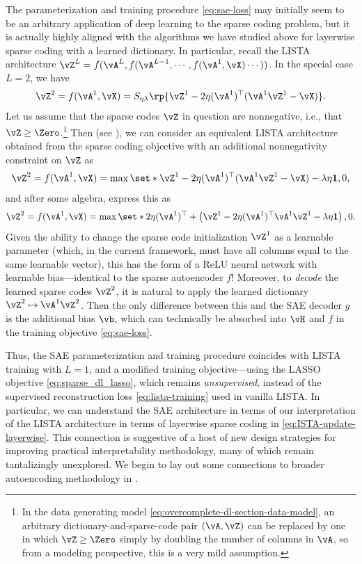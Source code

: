 \documentclass[../../book-main.tex]{subfiles}
\begin{document}
The parameterization and training procedure \eqref{eq:sae-loss} may initially
seem to be an arbitrary application of deep learning to the sparse coding
problem, but it is actually highly aligned with the algorithms we have studied
above for layerwise sparse coding with a learned dictionary.
In particular, recall the LISTA %
architecture $\vZ^{L} = f(\vA^L, f(\vA^{L-1}, \cdots, f(\vA^1, \vX) \cdots ))$.
In the special case $L=2$, we have
\begin{equation}
    \vZ^2 = f(\vA^1, \vX)
    =S_{\eta\lambda}\rp{\vZ^{1} - 2\eta(\vA^{1})^{\top}(\vA^1\vZ^{1} - \vX)}.
\end{equation}
Let us assume that the sparse codes $\vZ$ in question are nonnegative, i.e.,
that $\vZ \geq \Zero$.\footnote{In the data generating model
    \eqref{eq:overcomplete-dl-section-data-model}, an arbitrary
    dictionary-and-sparse-code pair $(\vA, \vZ)$ can be replaced by one in which
    $\vZ \geq \Zero$ simply by doubling the number of columns in $\vA$, so from
a modeling perspective, this is a very mild assumption.}
Then (see ), we can consider an equivalent
LISTA architecture obtained from the sparse coding objective with an additional
nonnegativity constraint on $\vZ$ as
\begin{equation}
    \vZ^2 = f(\vA^1, \vX)
    =\max \set*{\vZ^{1} - 2\eta(\vA^{1})^{\top}(\vA^1\vZ^{1} - \vX)
    - \lambda\eta \mathbf{1}, 0},
\end{equation}
and after some algebra, express this as
\begin{equation}
    \vZ^2 = f(\vA^1, \vX)
    =\max \set*{
        2\eta(\vA^{1})^{\top}
        +
        \left(
            \vZ^{1} - 2\eta(\vA^{1})^{\top}\vA^1\vZ^{1} - \lambda\eta \mathbf{1}
        \right), 0
    }.
\end{equation}
Given the ability to change the sparse code initialization $\vZ^1$ as
a learnable parameter (which, in the current framework, must have all columns
equal to the same learnable vector), this has the form of a ReLU neural network
with learnable bias---identical to the sparse autoencoder $f$!
Moreover, to \textit{decode} the learned sparse codes $\vZ^2$, it is natural to
apply the learned dictionary $\vZ^2 \mapsto \vA^1 \vZ^2$. Then the only
difference between this and the SAE decoder $g$ is the additional bias $\vb$,
which can technically be absorbed into $\vH$ and $f$ in the training objective
\eqref{eq:sae-loss}.

Thus, the SAE parameterization and training procedure coincides with
LISTA training with $L=1$, and a modified training objective---using the
LASSO objective \eqref{eq:sparse_dl_lasso}, which remains {\em
unsupervised}, instead
of the supervised reconstruction loss \eqref{eq:lista-training} used in vanilla
LISTA. In particular, we can understand the SAE architecture in terms of our
interpretation of the LISTA architecture in terms of layerwise sparse coding in
\eqref{eq:ISTA-update-layerwise}. This connection is suggestive of a host of new
design strategies for improving practical interpretability methodology, many of
which remain tantalizingly unexplored. We begin to lay out some connections to
broader autoencoding methodology in .
\end{document}

